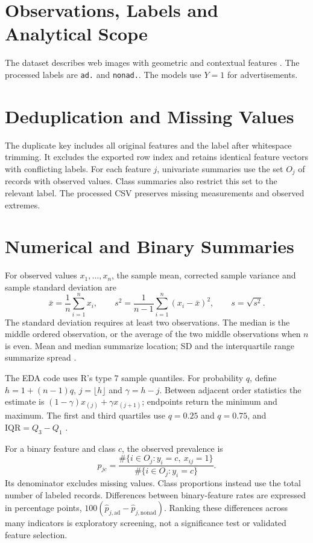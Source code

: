 \section{Observations, Labels and Analytical Scope}
The dataset describes web images with geometric and contextual features
\citep{kushmerick1999}. The processed labels are \texttt{ad.} and
\texttt{nonad.}. The models use \(Y=1\) for advertisements.

\section{Deduplication and Missing Values}
The duplicate key includes all original features and the label after
whitespace trimming. It excludes the exported row index and retains
identical feature vectors with conflicting labels. For each feature
\(j\), univariate summaries use the set \(O_j\) of records with observed
values. Class summaries also restrict this set to the relevant label.
The processed CSV preserves missing measurements and observed extremes.

\section{Numerical and Binary Summaries}
For observed values $x_1,\ldots,x_n$, the sample mean, corrected sample
variance and sample standard deviation are
\begin{equation}
\bar{x}=\frac{1}{n}\sum_{i=1}^n x_i,\qquad
s^2=\frac{1}{n-1}\sum_{i=1}^n(x_i-\bar{x})^2,\qquad s=\sqrt{s^2}.
\end{equation}
The standard deviation requires at least two observations. The median is the
middle ordered observation, or the average of the two middle observations
when $n$ is even. Mean and median summarize location; SD and the interquartile
range summarize spread \citep{nistHandbook}.

The EDA code uses R's type 7 sample quantiles. For probability $q$, define
$h=1+(n-1)q$, $j=\lfloor h\rfloor$ and $\gamma=h-j$. Between adjacent order
statistics the estimate is $(1-\gamma)x_{(j)}+\gamma x_{(j+1)}$; endpoints
return the minimum and maximum. The first and third quartiles use $q=0.25$
and $q=0.75$, and $\mathrm{IQR}=Q_3-Q_1$ \citep{rQuantile}.

For a binary feature and class $c$, the observed prevalence is
\begin{equation}
\hat{p}_{jc}=\frac{\#\{i\in O_j:y_i=c,\ x_{ij}=1\}}
{\#\{i\in O_j:y_i=c\}}.
\end{equation}
Its denominator excludes missing values. Class proportions instead use the
total number of labeled records. Differences between binary-feature rates
are expressed in percentage points, $100(\hat p_{j,\mathrm{ad}}-
\hat p_{j,\mathrm{nonad}})$. Ranking these differences across many indicators
is exploratory screening, not a significance test or validated feature selection.

